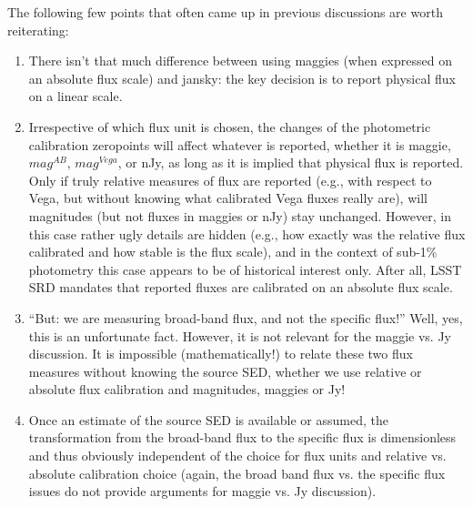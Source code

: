 \documentclass[PST,toc]{lsstdoc}
\begin{document}
The following few points that often came up in previous discussions are worth reiterating:
\begin{enumerate}
\item There isn't that much difference between using maggies (when expressed on an
absolute flux scale) and jansky: the key decision is to report physical flux on a linear scale.
\item Irrespective of which flux unit is chosen, the changes of the photometric
calibration zeropoints will affect whatever is reported, whether it is maggie, $mag^{AB}$,
$mag^{Vega}$, or nJy, as long as it is implied that physical flux is reported. Only if
truly relative measures of flux are reported (e.g., with respect to Vega, but without knowing
what calibrated Vega fluxes really are), will magnitudes (but not fluxes in maggies or
nJy) stay unchanged. However, in this case rather ugly details are hidden (e.g., how
exactly was the relative flux calibrated and how stable is the flux scale), and in the context
of sub-1\% photometry this case appears to be of historical interest only. After all,
LSST SRD mandates that reported fluxes are calibrated on an absolute flux scale.
\item ``But: we are measuring broad-band flux, and not the specific flux!''  Well,
yes, this is an unfortunate fact. However, it is not relevant for the maggie vs. Jy discussion.
It is impossible (mathematically!) to relate these two flux measures without knowing
the source SED, whether we use relative or absolute flux calibration and magnitudes,
maggies or Jy!
\item Once an estimate of the source SED is available or assumed, the transformation from
the broad-band flux to the specific flux is dimensionless and thus obviously independent
of the choice for flux units and relative vs. absolute calibration choice (again, the broad band
flux vs. the specific flux issues do not provide arguments for maggie vs. Jy discussion).
\end{enumerate}
\end{document}
